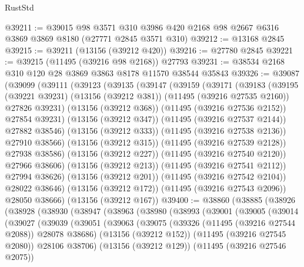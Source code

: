 \begin{lexlean}{RustStd}
\begin{coremodule}
@39211 := @39015
    @98
    @3571
    @310
    @3986
    @420
    @2168
    @98
    @2667
    @6316
    @3869
    @3869
    @8180
    (@27771 @2845 @3571 @310)
@39212 := @13168 @2845
@39215 := @39211 (@13156 (@39212 @420))
@39216 := @27780 @2845
@39221 := @39215 (@11495 (@39216 @98 @2168)) @27793
@39231 := @38534 @2168 @310 @120 @28 @3869 @3863 @8178 @11570 @38544 @35843
@39326 := @39087
    (@39099
      (@39111
        (@39123
          (@39135
            (@39147
              (@39159
                (@39171
                  (@39183
                    (@39195
                      (@39221 @39231)
                      (@13156 (@39212 @381))
                      (@11495 (@39216 @27535 @2160))
                      @27826
                      @39231)
                    (@13156 (@39212 @368))
                    (@11495 (@39216 @27536 @2152))
                    @27854
                    @39231)
                  (@13156 (@39212 @347))
                  (@11495 (@39216 @27537 @2144))
                  @27882
                  @38546)
                (@13156 (@39212 @333))
                (@11495 (@39216 @27538 @2136))
                @27910
                @38566)
              (@13156 (@39212 @315))
              (@11495 (@39216 @27539 @2128))
              @27938
              @38586)
            (@13156 (@39212 @227))
            (@11495 (@39216 @27540 @2120))
            @27966
            @38606)
          (@13156 (@39212 @213))
          (@11495 (@39216 @27541 @2112))
          @27994
          @38626)
        (@13156 (@39212 @201))
        (@11495 (@39216 @27542 @2104))
        @28022
        @38646)
      (@13156 (@39212 @172))
      (@11495 (@39216 @27543 @2096))
      @28050
      @38666)
    (@13156 (@39212 @167))
@39400 := @38860
    (@38885
      (@38926
        (@38928
          (@38930
            (@38947
              (@38963
                (@38980
                  (@38993
                    (@39001
                      (@39005
                        (@39014
                          (@39027
                            (@39039
                              (@39051
                                (@39063
                                  (@39075
                                    (@39326 (@11495 (@39216 @27544 @2088)) @28078 @38686)
                                    (@13156 (@39212 @152))
                                    (@11495 (@39216 @27545 @2080))
                                    @28106
                                    @38706)
                                  (@13156 (@39212 @129))
                                  (@11495 (@39216 @27546 @2075))

\end{coremodule}
\end{lexlean}
